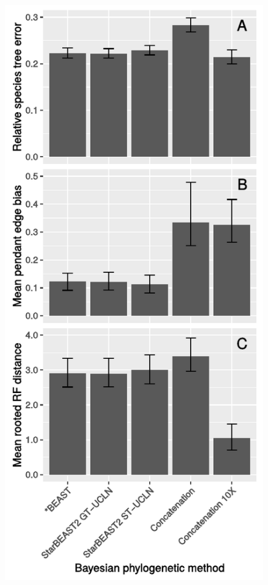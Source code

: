 \documentclass[nogrid]{MBE}%
\begin{document}
\begin{figure}[htb!]
\centering
\includegraphics[width=\columnwidth]{tree_error.pdf}

\end{figure}
\end{document}
